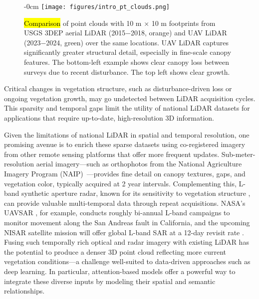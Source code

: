 \documentclass[remotesensing,article,accept,pdftex,moreauthors]{Definitions/mdpi}
\begin{document}
\vspace{-5pt}
\begin{figure}[H]
\begin{adjustwidth}{-\extralength}{0cm}
    \centering
    \texttt{[image: figures/intro\_pt\_clouds.png]}
\end{adjustwidth}
\caption{\hl{Comparison} %
 of point clouds with 10 m × 10 m footprints from USGS 3DEP aerial LiDAR (2015−2018, orange) and UAV LiDAR (2023−2024, green) over the same locations. UAV LiDAR captures significantly greater structural detail, especially in fine-scale canopy features. The bottom-left example shows clear canopy loss between surveys due to recent disturbance. The top left shows clear growth.}
    \label{fig:intro_pt_clouds}
\end{figure}


Critical changes in vegetation structure, such as disturbance-driven loss or ongoing vegetation growth, may go undetected between LiDAR acquisition cycles. This sparsity and temporal gaps limit the utility of national LiDAR datasets for applications that require up-to-date, high-resolution 3D information.

Given the limitations of national LiDAR in spatial and temporal resolution, one promising avenue is to enrich these sparse datasets using co-registered imagery from other remote sensing platforms that offer more frequent updates. Sub-meter-resolution aerial imagery—such as orthophotos from the National Agriculture Imagery Program (NAIP)~\cite{usda_naip_2024}—provides fine detail on canopy textures, gaps, and vegetation color, typically acquired at 2 year intervals. Complementing this, L-band synthetic aperture radar, known for its sensitivity to vegetation structure \cite{wang2025interpretable}, can provide valuable multi-temporal data through repeat acquisitions. NASA’s UAVSAR \cite{rosen2006uavsar}, for example, conducts roughly bi-annual L-band campaigns to monitor movement along the San Andreas fault in California, and the upcoming NISAR satellite mission will offer global L-band SAR at a 12-day revisit rate \cite{kellogg2020nasa}. Fusing such temporally rich optical and radar imagery with existing LiDAR has the potential to produce a denser 3D point cloud reflecting more current vegetation conditions—a challenge well-suited to data-driven approaches such as deep learning. In particular, attention-based models offer a powerful way to integrate these diverse inputs by modeling their spatial and semantic relationships.
\end{document}
